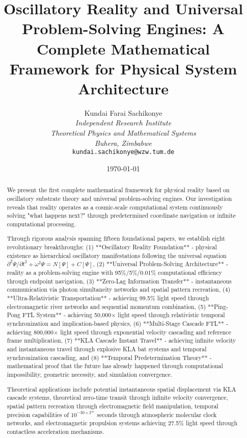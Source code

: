 \documentclass[12pt,a4paper]{article}
\title{\textbf{Oscillatory Reality and Universal Problem-Solving Engines: A Complete Mathematical Framework for Physical System Architecture}}
\author{
Kundai Farai Sachikonye\\
\textit{Independent Research Institute}\\
\textit{Theoretical Physics and Mathematical Systems}\\
\textit{Buhera, Zimbabwe}\\
\texttt{kundai.sachikonye@wzw.tum.de}
}
\date{\today}
\theoremstyle{remark}
\begin{document}
\maketitle

\begin{abstract}
We present the first complete mathematical framework for physical reality based on oscillatory substrate theory and universal problem-solving engines. Our investigation reveals that reality operates as a cosmic-scale computational system continuously solving "what happens next?" through predetermined coordinate navigation or infinite computational processing. 

Through rigorous analysis spanning fifteen foundational papers, we establish eight revolutionary breakthroughs: (1) **Oscillatory Reality Foundation** - physical existence as hierarchical oscillatory manifestations following the universal equation $\partial^2\Psi/\partial t^2 + \omega^2\Psi = N[\Psi] + C[\Psi]$, (2) **Universal Problem-Solving Architecture** - reality as a problem-solving engine with 95\%/5\%/0.01\% computational efficiency through endpoint navigation, (3) **Zero-Lag Information Transfer** - instantaneous communication via photon simultaneity networks and spatial pattern recreation, (4) **Ultra-Relativistic Transportation** - achieving 99.5\% light speed through electromagnetic river networks and sequential momentum combination, (5) **Ping-Pong FTL System** - achieving 50,000× light speed through relativistic temporal synchronization and implication-based physics, (6) **Multi-Stage Cascade FTL** - achieving 800,000× light speed through exponential velocity cascading and reference frame multiplication, (7) **KLA Cascade Instant Travel** - achieving infinite velocity and instantaneous travel through explosive KLA bat systems and temporal synchronization cascading, and (8) **Temporal Predetermination Theory** - mathematical proof that the future has already happened through computational impossibility, geometric necessity, and simulation convergence.

Theoretical applications include potential instantaneous spatial displacement via KLA cascade systems, theoretical zero-time transit through infinite velocity convergence, spatial pattern recreation through electromagnetic field manipulation, temporal precision capabilities of $10^{-30 \times 2^{\infty}}$ seconds through atmospheric molecular clock networks, and electromagnetic propulsion systems achieving 27.5\% light speed through contactless acceleration mechanisms.


\end{abstract}
\end{document}
